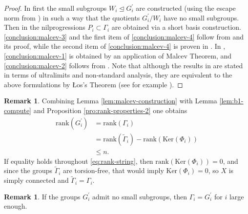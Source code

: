 \documentclass[12pt]{amsart}
\theoremstyle{definition}
\def\fnum{equation}
\newtheorem{remark}[\fnum]{Remark}
\numberwithin{equation}{section}
\newcommand{\Ker}{{\text{Ker}}}
\newcommand{\rank}{{\text{rank}}}
\begin{document}
\begin{proof}
    In \cite[Section 6]{zamora-limits} first the small subgroups $W_i\trianglelefteq G_i^{\prime }$ are constructed (using the escape norm from \cite{breuillard-green-tao}) in such a way that the quotients $G_i^{\prime }/ W_i$ have no small subgroups. Then in \cite[Section 9]{breuillard-green-tao} the nilprogressions $P_i \subset \Gamma _ i$ are obtained via a short basis construction. \eqref{conclusion:malcev-3} and the first item of \eqref{conclusion:malcev-4} follow from \cite[Theorem 9.3]{breuillard-green-tao} and its proof, while the second item of  \eqref{conclusion:malcev-4} is proven in \cite[Theorem 7.1]{zamora-limits}.  In \cite[Section 8]{zamora-limits}, \eqref{conclusion:malcev-1} is obtained by an application of Malcev Theorem, and \eqref{conclusion:malcev-2} follows from \cite[Proposition 9.1]{zamora-limits}. Note that although the results in \cite{breuillard-green-tao, zamora-limits} are stated in terms of ultralimits and non-standard analysis, they are equivalent to the above formulations by \L os's Theorem (see for example \cite[Appendix C]{breuillard-green-tao}). 
\end{proof}



\begin{remark}\label{rem:rank-equality}
    Combining Lemma \ref{lem:malcev-construction} with Lemma \ref{lem:b1-compute} and Proposition  \ref{pro:rank-properties-2}  one obtains
    \begin{equation}\label{eq:rank-string}
   \begin{split}
        \rank (G_i^{\prime} ) & =  \rank (\Gamma _i )  \\
        & = \rank (\tilde {\Gamma}_i) - \rank (\Ker (\Phi _ i)) \\
        & \leq  n.
   \end{split}
    \end{equation}
If equality holds throughout  \eqref{eq:rank-string}, then $\rank (\Ker (\Phi_i) ) = 0$, and since the groups $\tilde{\Gamma}_i$ are torsion-free, that would imply $\Ker (\Phi _ i ) = 0$, so $X$ is simply connected and $\tilde {\Gamma }_i = \Gamma_i$.
\end{remark}

\begin{remark}\label{rem:nss-case}
    If the groups $G_i^{\prime}$ admit no small subgroups, then $\Gamma_i = G_i ^{\prime}$ for $i$ large enough.
\end{remark}
\end{document}
